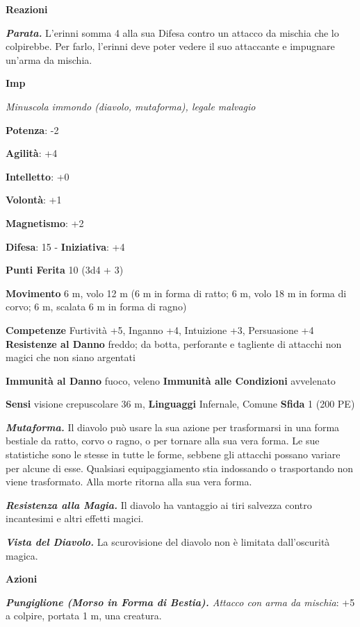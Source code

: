 \begin{multicols}{2}
\textbf{Reazioni}

\emph{\textbf{Parata.}} L'erinni somma 4 alla sua Difesa contro un attacco
da mischia che lo colpirebbe. Per farlo, l'erinni deve poter vedere il
suo attaccante e impugnare un'arma da mischia.



\textbf{Imp}

\emph{Minuscola immondo (diavolo, mutaforma), legale malvagio}

\textbf{Potenza}: -2

\textbf{Agilità}: +4

\textbf{Intelletto}: +0

\textbf{Volontà}: +1

\textbf{Magnetismo}: +2

\textbf{Difesa}: 15 - \textbf{Iniziativa}: +4

\textbf{Punti Ferita} 10 (3d4 + 3)

\textbf{Movimento} 6 m, volo 12 m (6 m in forma di ratto; 6 m, volo 18 m
in forma di corvo; 6 m, scalata 6 m in forma di ragno)

\textbf{Competenze} Furtività +5, Inganno +4, Intuizione +3, Persuasione +4
\textbf{Resistenze al Danno} freddo; da botta, perforante e tagliente
di attacchi non magici che non siano argentati

\textbf{Immunità al Danno} fuoco, veleno \textbf{Immunità alle
Condizioni} avvelenato

\textbf{Sensi} visione crepuscolare 36 m, 
\textbf{Linguaggi} Infernale, Comune \textbf{Sfida} 1 (200 PE)\smallskip

\emph{\textbf{Mutaforma.}} Il diavolo può usare la sua azione per
trasformarsi in una forma bestiale da ratto, corvo o ragno, o per
tornare alla sua vera forma. Le sue statistiche sono le stesse in tutte
le forme, sebbene gli attacchi possano variare per alcune di esse.
Qualsiasi equipaggiamento stia indossando o trasportando non viene
trasformato. Alla morte ritorna alla sua vera forma.

\emph{\textbf{Resistenza alla Magia.}} Il diavolo ha vantaggio ai tiri
salvezza contro incantesimi e altri effetti magici.

\emph{\textbf{Vista del Diavolo.}} La scurovisione del diavolo non è
limitata dall'oscurità magica.

\smallskip\textbf{Azioni}

\emph{\textbf{Pungiglione (Morso in Forma di Bestia).} Attacco con arma
da mischia}: +5 a colpire, portata 1 m, una creatura.


\end{multicols}

